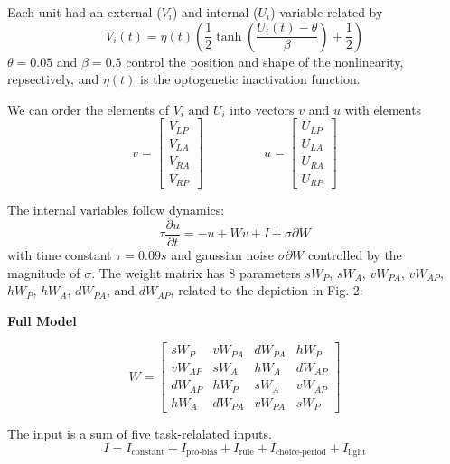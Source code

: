 \documentclass[11pt]{article}
\begin{document}
 Each unit had an external ($V_i$) and internal ($U_i$) variable related by
\begin{equation}
V_i(t) =\eta(t)\left(\frac{1}{2}\tanh\left(\frac{U_i(t) - \theta}{\beta}\right)+ \frac{1}{2} \right)
\end{equation}
$\theta = 0.05$ and $\beta = 0.5$ control the position and shape of the nonlinearity, repsectively, and $\eta(t)$ is the optogenetic inactivation function.

We can order the elements of $V_i$ and $U_i$ into vectors $v$ and $u$ with elements
\begin{equation}
v = \begin{bmatrix} V_{LP} \\ V_{LA} \\ V_{RA} \\ V_{RP} \end{bmatrix} \hspace{2cm} u = \begin{bmatrix} U_{LP} \\ U_{LA} \\ U_{RA} \\ U_{RP} \end{bmatrix}
\end{equation}

 The internal variables follow dynamics:
\begin{equation}
\tau \frac{\partial u}{\partial t} = -u + Wv + I + \sigma \partial W
\end{equation}
with time constant $\tau = 0.09s$ and gaussian noise $\sigma \partial W$ controlled by the magnitude of $\sigma$.  The weight matrix has 8 parameters $sW_P$, $sW_A$, $vW_{PA}$, $vW_{AP}$, $hW_P$, $hW_A$, $dW_{PA}$, and $dW_{AP}$,  related to the depiction in Fig. 2:
\begin{center}
\textbf{Full Model} \\
\end{center}
\begin{equation}
W = \begin{bmatrix} sW_P & vW_{PA} &  dW_{PA} & hW_P \\ vW_{AP}  & sW_A & hW_A  & dW_{AP} \\ dW_{AP} & hW_P & sW_A & vW_{AP}  \\  hW_A & dW_{PA} & vW_{PA}  & sW_P \end{bmatrix}
\end{equation}

The input is a sum of five task-relalated inputs.
\begin{equation}
I = I_{\text{constant}} + I_{\text{pro-bias}} + I_{\text{rule}} + I_{\text{choice-period}} + I_{\text{light}}
\end{equation}
\end{document}
